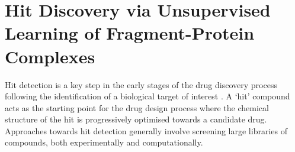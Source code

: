 
\chapter{Hit Discovery via Unsupervised Learning of Fragment-Protein Complexes} \label{ch:fresco}




Hit detection is a key step in the early stages of the drug discovery process following the identification of a biological target of interest \cite{Hughes2011Principles}. A `hit' compound acts as the starting point for the drug design process where the chemical structure of the hit is progressively optimised towards a candidate drug. Approaches towards hit detection generally involve screening large libraries of compounds, both experimentally and computationally.

